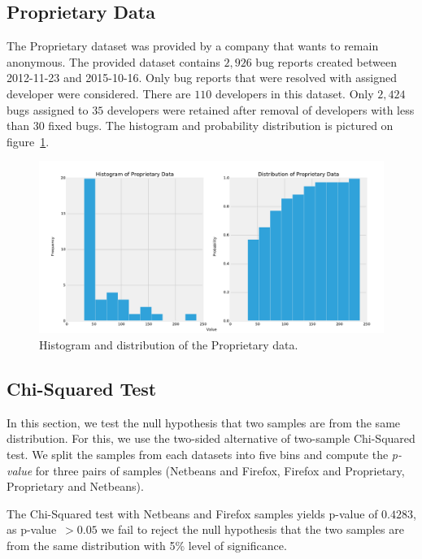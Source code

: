 \subsection{Proprietary Data}

The Proprietary dataset was provided by a company that wants to remain anonymous. The provided dataset contains $2,926$ bug reports created between 2012-11-23 and 2015-10-16. Only bug reports that were resolved with assigned developer were considered. There are $110$ developers in this dataset. Only $2,424$ bugs assigned to $35$ developers were retained after removal of developers with less than $30$ fixed bugs. The histogram and probability distribution is pictured on figure~\ref{fig:datasets.proprietary.dist}.

\begin{figure}[htbp]
    \centering
        \includegraphics[width=\textwidth]{./images/distribution/proprietary.pdf}
    \caption{Histogram and distribution of the Proprietary data.}
    \label{fig:datasets.proprietary.dist}
\end{figure}

\subsection{Chi-Squared Test}

In this section, we test the null hypothesis that two samples are from the same distribution. For this, we use the two-sided alternative of two-sample Chi-Squared test. We split the samples from each datasets into five bins and compute the \textit{p-value} for three pairs of samples (Netbeans and Firefox, Firefox and Proprietary, Proprietary and Netbeans).

The Chi-Squared test with Netbeans and Firefox samples yields p-value of $0.4283$, as p-value~$> 0.05$ we fail to reject the null hypothesis that the two samples are from the same distribution with 5\% level of significance.

